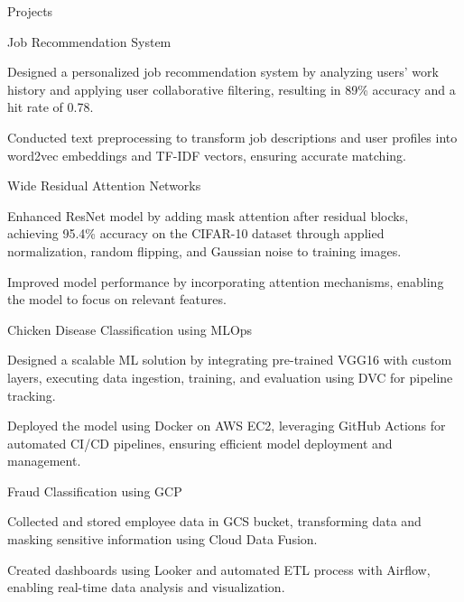 \documentclass{resume}
\begin{document}
\begin{rSection}{Projects}
\begin{rSubsectionProj}{Job Recommendation System}

\vspace{-3pt}
\item Designed a personalized job recommendation system by analyzing users' work history and applying user collaborative filtering, resulting in 89\% accuracy and a hit rate of 0.78.
\vspace{-3pt}
\item Conducted text preprocessing to transform job descriptions and user profiles into word2vec embeddings and TF-IDF vectors, ensuring accurate matching.
\end{rSubsectionProj}
\vspace{-3pt}

\begin{rSubsectionProj}{Wide Residual Attention Networks}

\vspace{-3pt}
\item Enhanced ResNet model by adding mask attention after residual blocks, achieving 95.4\% accuracy on the CIFAR-10 dataset through applied normalization, random flipping, and Gaussian noise to training images.
\vspace{-3pt}
\item Improved model performance by incorporating attention mechanisms, enabling the model to focus on relevant features.
\end{rSubsectionProj}
\vspace{-3pt}

\begin{rSubsectionProj}{Chicken Disease Classification using MLOps}

\vspace{-3pt}
\item Designed a scalable ML solution by integrating pre-trained VGG16 with custom layers, executing data ingestion, training, and evaluation using DVC for pipeline tracking.
\vspace{-3pt}
\item Deployed the model using Docker on AWS EC2, leveraging GitHub Actions for automated CI/CD pipelines, ensuring efficient model deployment and management.
\end{rSubsectionProj}
\vspace{-3pt}

\begin{rSubsectionProj}{Fraud Classification using GCP}

\vspace{-3pt}
\item Collected and stored employee data in GCS bucket, transforming data and masking sensitive information using Cloud Data Fusion.
\vspace{-3pt}
\item Created dashboards using Looker and automated ETL process with Airflow, enabling real-time data analysis and visualization.
\end{rSubsectionProj}
\end{rSection}
\end{document}
